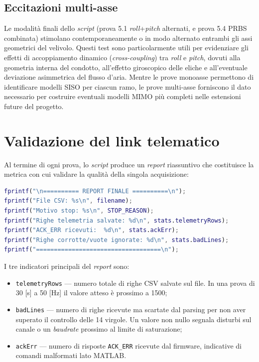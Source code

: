 \documentclass[11pt]{report}
\begin{document}
	\subsection{Eccitazioni multi-asse}
	Le modalità finali dello \textit{script} (prova 5.1 \textit{roll}+\textit{pitch} alternati, e prova 5.4 PRBS combinata) stimolano contemporaneamente o in modo alternato entrambi gli assi geometrici del velivolo. Questi test sono particolarmente utili per evidenziare gli effetti di accoppiamento dinamico (\textit{cross-coupling}) tra \textit{roll} e \textit{pitch}, dovuti alla geometria interna del condotto, all'effetto giroscopico delle eliche e all'eventuale deviazione asimmetrica del flusso d'aria. Mentre le prove monoasse permettono di identificare modelli SISO per ciascun ramo, le prove multi-asse forniscono il dato necessario per costruire eventuali modelli MIMO più completi nelle estensioni future del progetto.
	
	\section{Validazione del link telematico}
	\label{sec:validazione_link}
	
	Al termine di ogni prova, lo \textit{script} produce un \textit{report} riassuntivo che costituisce la metrica con cui validare la qualità della singola acquisizione:
	
	\begin{lstlisting}[language=Matlab, caption={Esempio di report di fine prova}]
fprintf("\n========== REPORT FINALE ==========\n");
fprintf("File CSV: %s\n", filename);
fprintf("Motivo stop: %s\n", STOP_REASON);
fprintf("Righe telemetria salvate: %d\n", stats.telemetryRows);
fprintf("ACK_ERR ricevuti:  %d\n", stats.ackErr);
fprintf("Righe corrotte/vuote ignorate: %d\n", stats.badLines);
fprintf("===================================\n");
	\end{lstlisting}
	
	I tre indicatori principali del \textit{report} sono:
	\begin{itemize}
		\item \texttt{telemetryRows} --- numero totale di righe CSV salvate sul file. In una prova di 30 [s] a 50 [Hz] il valore atteso è prossimo a 1500;
		\item \texttt{badLines} --- numero di righe ricevute ma scartate dal parsing per non aver superato il controllo delle 14 virgole. Un valore non nullo segnala disturbi sul canale o un \textit{baudrate} prossimo al limite di saturazione;
		\item \texttt{ackErr} --- numero di risposte \texttt{ACK\_ERR} ricevute dal firmware, indicative di comandi malformati lato MATLAB.
	\end{itemize}
	
\end{document}
